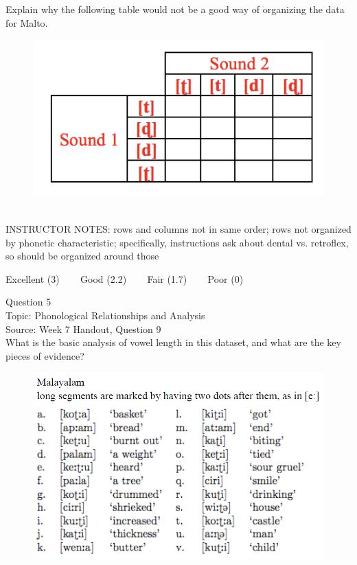 \documentclass[12pt]{article}
\begin{document}
Explain why the following table would not be a good way of organizing the data for Malto.\\

\begin{figure}[H]
\includegraphics{../images/Malto_table_bad.png}
\end{figure}

~\\
INSTRUCTOR NOTES: rows and columns not in same order; rows not organized by phonetic characteristic; specifically, instructions ask about dental vs. retroflex, so should be organized around those


\vfill
Excellent (3) ~~~ Good (2.2) ~~~ Fair (1.7) ~~~ Poor (0)
\newpage

{\large Question 5}\\

Topic: Phonological Relationships and Analysis\\
Source: Week 7 Handout, Question 9\\

What is the basic analysis of vowel length in this dataset, and what are the key pieces of evidence?\\

\begin{figure}[H]
\includegraphics{../images/malayalam.png}
\end{figure}
\end{document}
